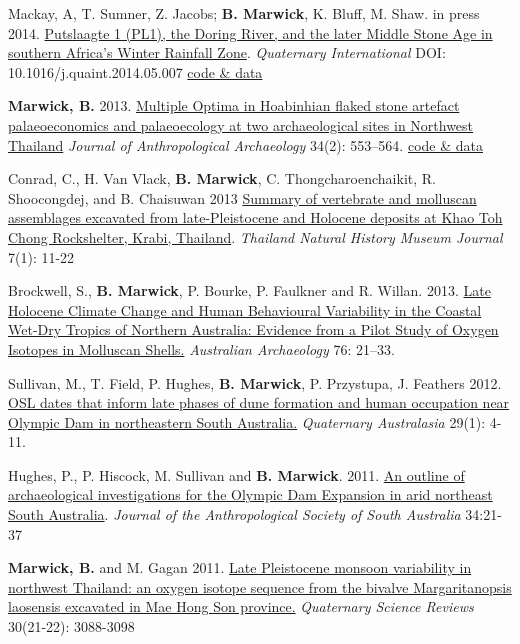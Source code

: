\documentclass[11pt,article,oneside]{memoir}
\begin{document}
{{{{\ind Mackay, A, T. Sumner, Z. Jacobs; \textbf{B. Marwick}, K. Bluff, M. Shaw. in press 2014.  \href{http://faculty.washington.edu/bmarwick/PDFs/Mackay_et_al_2014.pdf}{Putslaagte 1 (PL1), the Doring River, and the later Middle Stone Age in southern Africa's Winter Rainfall Zone}. \textit{Quaternary International} \newline DOI: 10.1016/j.quaint.2014.05.007 \href{https://github.com/benmarwick/Particle-size-analysis-Putslaagte-1}{code \& data}

\ind \textbf{Marwick, B.} 2013. \href{http://faculty.washington.edu/bmarwick/PDFs/Marwick_2013_JAA.pdf}{Multiple Optima in Hoabinhian flaked stone artefact palaeoeconomics and palaeoecology at two archaeological sites in Northwest Thailand} \textit{Journal of Anthropological Archaeology} 34(2): 553–564. \href{http://dx.doi.org/10.6084/m9.figshare.765252}{code \& data}

\ind Conrad, C., H. Van Vlack, \textbf{B. Marwick}, C. Thongcharoenchaikit, R. Shoocongdej, and B. Chaisuwan 2013 \href{http://faculty.washington.edu/bmarwick/PDFs/Conrad_et_al_2013_TNHMJ.pdf}{Summary of vertebrate and molluscan assemblages excavated from late-Pleistocene and Holocene deposits at Khao Toh Chong Rockshelter, Krabi, Thailand}. \textit{Thailand Natural History Museum Journal} 7(1): 11-22

\ind Brockwell, S., \textbf{B. Marwick}, P. Bourke, P. Faulkner and R. Willan. 2013. \href{http://faculty.washington.edu/bmarwick/PDFs/Brockwell_et_al_2013_AA.pdf}{Late Holocene Climate Change and Human Behavioural Variability in the Coastal Wet-Dry Tropics of Northern Australia: Evidence from a Pilot Study of Oxygen Isotopes in Molluscan Shells.} \textit{Australian Archaeology} 76: 21–33.

\ind Sullivan, M., T. Field, P. Hughes, \textbf{B. Marwick}, P. Przystupa, J. Feathers 2012. \href{http://faculty.washington.edu/bmarwick/PDFs/Sullivan_et_al_2012_OSL_dates_ODX.pdf}{OSL dates that inform late phases of dune formation and human occupation near Olympic Dam in northeastern South Australia.} \textit{Quaternary Australasia} 29(1): 4-11.

\ind Hughes, P., P. Hiscock, M. Sullivan and \textbf{B. Marwick}. 2011. \href{http://faculty.washington.edu/bmarwick/PDFs/Hughes_et_al_2011_JASSA.pdf}{An outline of archaeological investigations for the Olympic Dam Expansion in arid northeast South Australia}. \textit{Journal of the Anthropological Society of South Australia} 34:21-37

\ind \textbf{Marwick, B.} and M. Gagan 2011. \href{http://faculty.washington.edu/bmarwick/PDFs/Marwick_and_Gagan_2011_QSR.pdf}{Late Pleistocene monsoon variability in northwest Thailand: an oxygen isotope sequence from the bivalve Margaritanopsis laosensis excavated in Mae Hong Son province.} \textit{Quaternary Science Reviews} 30(21-22): 3088-3098

}}}}
\end{document}
